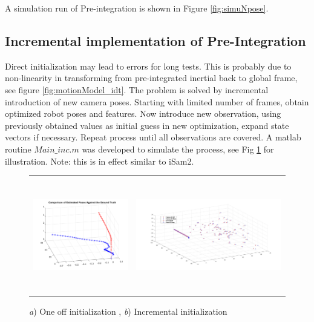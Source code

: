 \documentclass[12pt]{article}   %
\begin{document}
A simulation run of Pre-integration is shown in Figure \ref{fig:simuNpose}. 


\subsection{Incremental implementation of Pre-Integration}
Direct initialization may lead to errors for long tests. This is probably due to non-linearity in transforming from pre-integrated inertial back to global frame, see figure \ref{fig:motionModel_idt}. The problem is solved by incremental introduction of new camera poses. Starting with limited number of frames, obtain optimized robot poses and features. Now introduce new observation, using previously obtained values as initial guess in new optimization, expand state vectors if necessary. Repeat process until all observations are covered. A matlab routine $Main\_inc.m$ was developed to simulate the process, see Fig \ref{fig:preint_init} for illustration. Note: this is in effect similar to iSam2.

	\begin{figure}[h!]
		\begin{center}\begin{tabular}{cc}
				\includegraphics[height=5cm]{figures/simuNpose_error.png} &
				\includegraphics[height=5cm]{Figures/Final_pose-feature_3D_GT-vs-SLAM.jpg}\\				
			\end{tabular}\end{center}
			\caption{\emph{a}) One off initialization , \emph{b}) Incremental initialization } 
			\label{fig:preint_init}
	\end{figure} 
\end{document}
